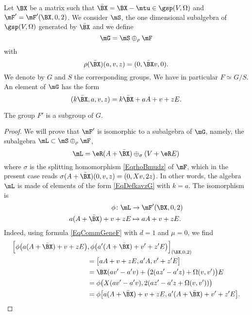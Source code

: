 Let $\BX $ be a matrix such that $\bar{\BX }=\BX -\mtu\in\gsp(V,\Omega)$ and $\mF'=\mF'(\BX,0,2)$. We consider $\mS$, the one dimensional subalgebra of $\gsp(V,\Omega)$ generated by $\bar{\BX}$ and we define
\begin{equation}
  \mG=\mS\oplus_{\rho}\mF
\end{equation} 
with 
\[ 
  \rho(\bar{\BX })(a,v,z)=(0,\bar{\BX }v,0).
\]
We denote by $G$ and $S$ the corresponding groups. We have in particular $F\simeq G/S$. An element of $\mG$ has the form
\begin{equation}	\label{EqDefkavzG}
  (k\bar\BX,a,v,z)=k\bar\BX+aA+v+zE.
\end{equation}


\begin{proposition}
The group $F'$ is a subgroup of $G$.
\end{proposition}
\begin{proof}
We will prove that $\mF'$ is isomorphic to a subalgebra of $\mG$, namely, the subalgebra $\mL\subset \mS\oplus_{\rho}\mF$,
\[ 
  \mL=\eR(A+\bar\BX)\oplus_{\sigma}(V+\eR E)
\]
where $\sigma$ is the splitting homomorphism \eqref{EqrhoBmudz} of $\mF$, which in the present case reads $\sigma(A+\bar\BX)(0,v,z)=(0,Xv,2z)$. In other words, the algebra $\mL$ is made of elements of the form \eqref{EqDefkavzG} with $k=a$.  The isomorphism is 
\begin{equation}
\begin{aligned}
\phi  \colon \mL&\to \mF'(\BX,0,2) \\ 
a(A+\bar\BX)+v+zE&\mapsto aA+v+zE. 
\end{aligned}
\end{equation}
Indeed, using formula \eqref{EqCommGeneF} with $d=1$ and $\mu=0$, we find
\[ 
\begin{split}
\Big[ \phi\big( a(A+\bar{\BX })+v+zE \big)&,\phi\big( a'(A+\bar{\BX })+v'+z'E \big) \Big]_{(\BX,0,2)}\\
		&=\big[ aA+v+zE,a'A,v'+z'E \big]\\
	 	&=\BX (av'-a'v)+\big(2(az'-a'z)+\Omega(v,v')\big)E\\
	&=\phi\big( X(av'-a'v),2(az'-a'z+\Omega(v,v'))  \big)\\
&=\phi\big[ a(A+\bar{\BX })+v+zE,a'(A+\bar{\BX })+v'+z'E \big].
\end{split}  
\]
\end{proof}

